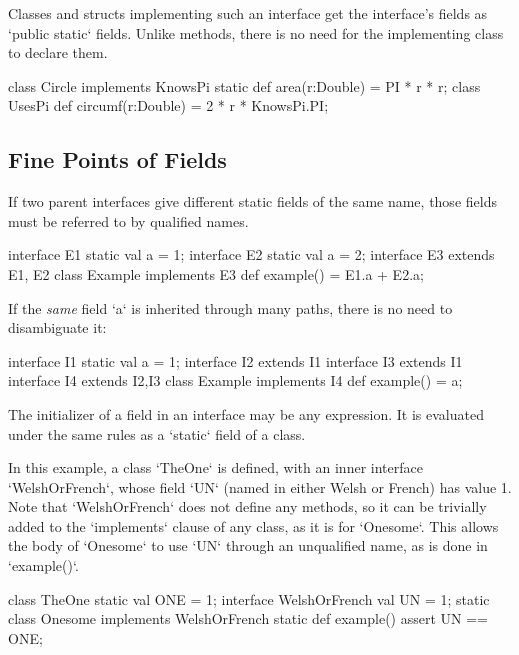 Classes and structs implementing such an interface get the interface's fields as
\xcd`public static` fields.  Unlike  methods, there is no need
for the implementing class to declare them. 
\begin{xten}
class Circle implements KnowsPi {
  static def area(r:Double) = PI * r * r;
}
class UsesPi {
  def circumf(r:Double) = 2 * r * KnowsPi.PI;
}
\end{xten}
%

\subsection{Fine Points of Fields}

If two parent interfaces give different static fields of the same name, 
those fields must be referred to by qualified names.
% 
\begin{xten}
interface E1 {static val a = 1;}
interface E2 {static val a = 2;}
interface E3 extends E1, E2{}
class Example implements E3 {
  def example() = E1.a + E2.a;
}
\end{xten}
%

If the {\em same} field \xcd`a` is inherited through many paths, there is no need to
disambiguate it:
\begin{xten}
interface I1 { static val a = 1;} 
interface I2 extends I1 {}
interface I3 extends I1 {}
interface I4 extends I2,I3 {}
class Example implements I4 {
  def example() = a;
}
\end{xten}
%

The initializer of a field in an interface may be any expression.  It is
evaluated under the same rules as a \xcd`static` field of a class. 

\begin{ex}
In this example, a class \xcd`TheOne` is defined,
with an inner interface \xcd`WelshOrFrench`, whose field \xcd`UN` (named in
either Welsh or French) has value 1.  Note that \xcd`WelshOrFrench` does not
define any methods, so it can be trivially added to the \xcd`implements`
clause of any class, as it is for \xcd`Onesome`. 
This allows the body of \xcd`Onesome` to use \xcd`UN` through an unqualified
name, as is done in \xcd`example()`.

\begin{xten}
class TheOne {
  static val ONE = 1;
  interface WelshOrFrench {
    val UN = 1;
  }
  static class Onesome implements WelshOrFrench {
    static def example() {
      assert UN == ONE;
    }
  }
}
\end{xten}
\end{ex}

